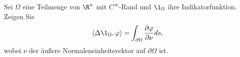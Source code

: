 
\begin{exercise}

Sei $\Omega$ eine Teilmenge von $\R^n$ mit $C^{\infty}$-Rand und $\1_\Omega$ ihre
Indikatorfunktion. Zeigen Sie
\begin{align*}
  \langle \Delta \1_\Omega, \varphi \rangle
  = \int_{\partial\Omega} \frac{\partial \varphi}{\partial \nu} ds,
\end{align*}
wobei $\nu$ der äußere Normaleneinheitsvektor auf $\partial\Omega$ ist.

\end{exercise}


\begin{solution}

\phantom{}

\end{solution}

